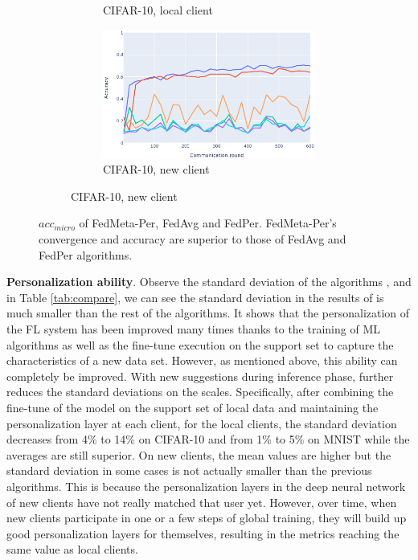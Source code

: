\documentclass[runningheads]{llncs}
\begin{document}
\begin{figure}[h]
\begin{subfigure}{\textwidth}
\begin{subfigure}{.49\textwidth}
            \caption{CIFAR-10, local client}\label{cifar_old_per}
        \end{subfigure}
        \begin{subfigure}{.49\textwidth}
            \includegraphics[width=\linewidth]{img/cifar_new_per.eps}
            \caption{CIFAR-10, new client}\label{cifar_new_per}
        \end{subfigure}
    \end{subfigure}
    \caption{$acc_{micro}$ of FedMeta-Per, FedAvg and FedPer. FedMeta-Per's convergence and accuracy are superior to those of FedAvg and FedPer algorithms.} \label{fig:fedpermeta_vs_chicken}
\end{figure}

\textbf{Personalization ability}. Observe the standard deviation of the algorithms ,  and  in Table \ref{tab:compare}, we can see the standard deviation in the results of  is much smaller than the rest of the algorithms. It shows that the personalization of the FL system has been improved many times thanks to the training of ML algorithms as well as the fine-tune execution on the support set to capture the characteristics of a new data set. However, as mentioned above, this ability can completely be improved. With new suggestions during inference phase,  further reduces the standard deviations on the scales. Specifically, after combining the fine-tune of the model on the support set of local data and maintaining the personalization layer at each client, for the local clients, the standard deviation decreases from 4\% to 14\% on CIFAR-10 and from 1\% to 5\% on MNIST while the averages are still superior. On new clients, the mean values are higher but the standard deviation in some cases is not actually smaller than the previous algorithms. This is because the personalization layers in the deep neural network of new clients have not really matched that user yet. However, over time, when new clients participate in one or a few steps of global training, they will build up good personalization layers for themselves, resulting in the metrics reaching the same value as local clients.
\end{document}
